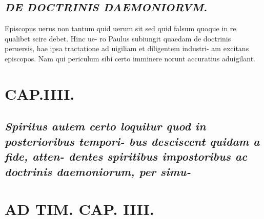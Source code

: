 \documentclass{article}
\begin{document}
\begin{pages}
\subsection*{\textit{DE DOCTRINIS DAEMONIORVM. }}\pstart Episcopus uerus non tantum quid uerum sit sed quid falsum quoque in re qualibet scire debet. Hinc ue- ro Paulus subiungit quaedam de doctrinis peruersis, hae ipsa tractatione ad uigiliam et diligentem industri- am excitans episcopos. Nam qui periculum sibi certo imminere norunt accuratius aduigilant.  \pend
\endnumbering\beginnumbering\section{CAP.IIII.}
{}
\subsection*{\textit{Spiritus autem certo loquitur quod in posterioribus tempori- bus desciscent quidam a fide, atten- dentes spiritibus impostoribus ac doctrinis daemoniorum, per simu- }}
{}
\subsection*{\textit{}}
\section*{AD TIM. CAP. IIII. }
\marginpar{[ p.137 ]}
{}

\end{pages}
\end{document}
